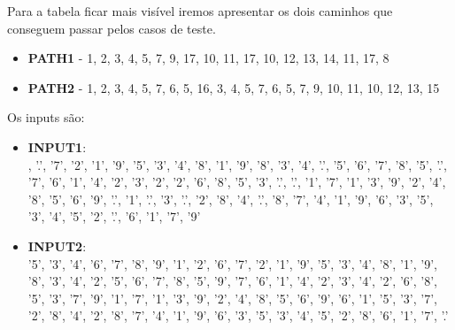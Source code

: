 \documentclass{article}
\begin{document}
\begin{itemize}
\begin{enumerate}
    Para a tabela ficar mais visível iremos apresentar os dois caminhos que conseguem passar pelos casos de teste.\\
    \begin{itemize}
        \item \textbf{PATH1} - 1, 2, 3, 4, 5, 7, 9, 17, 10, 11, 17, 10, 12, 13, 14, 11, 17, 8
        \item \textbf{PATH2} - 1, 2, 3, 4, 5, 7, 6, 5, 16, 3, 4, 5, 7, 6, 5, 7, 9, 10, 11, 10, 12, 13, 15
    \end{itemize}
    Os inputs são:\\
    \begin{itemize}
        \item \textbf{INPUT1}:\\,\newline
        {'.', '7', '2', '1', '9', '5', '3', '4', '8'},\newline
        {'1', '9', '8', '3', '4', '.', '5', '6', '7'},\newline
        {'8', '5', '.', '7', '6', '1', '4', '2', '3'},\newline
        {'2', '2', '6', '8', '5', '3', '.', '.', '1'},\newline
        {'7', '1', '3', '9', '2', '4', '8', '5', '6'},\newline
        {'9', '.', '1', '.', '3', '.', '2', '8', '4'},\newline
        {'.', '8', '7', '4', '1', '9', '6', '3', '5'},\newline
        {'3', '4', '5', '2', '.', '6', '1', '7', '9'}\newline

        \item \textbf{INPUT2}:\\\newline 
            {'5', '3', '4', '6', '7', '8', '9', '1', '2'},\newline
            {'6', '7', '2', '1', '9', '5', '3', '4', '8'},\newline
            {'1', '9', '8', '3', '4', '2', '5', '6', '7'},\newline
            {'8', '5', '9', '7', '6', '1', '4', '2', '3'},\newline
            {'4', '2', '6', '8', '5', '3', '7', '9', '1'},\newline
            {'7', '1', '3', '9', '2', '4', '8', '5', '6'},\newline
            {'9', '6', '1', '5', '3', '7', '2', '8', '4'},\newline
            {'2', '8', '7', '4', '1', '9', '6', '3', '5'},\newline
            {'3', '4', '5', '2', '8', '6', '1', '7', '.'}\newline
       

\end{itemize}
\end{enumerate}
\end{itemize}
\end{document}
